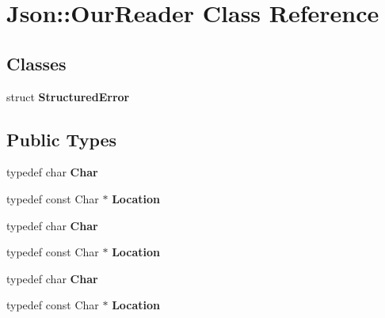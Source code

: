 \section{Json\+:\+:Our\+Reader Class Reference}
\label{class_json_1_1_our_reader}
\subsection*{Classes}
\begin{DoxyCompactItemize}
\item 
struct {\bf Structured\+Error}
\end{DoxyCompactItemize}
\subsection*{Public Types}
\begin{DoxyCompactItemize}
\item 
typedef char {\bfseries Char}\label{class_json_1_1_our_reader_a0cd0bab4caa66594ab843ccd5f9dc239}

\item 
typedef const Char $\ast$ {\bfseries Location}\label{class_json_1_1_our_reader_a1bdc7bbc52ba87cae6b19746f2ee0189}

\item 
typedef char {\bfseries Char}\label{class_json_1_1_our_reader_a0cd0bab4caa66594ab843ccd5f9dc239}

\item 
typedef const Char $\ast$ {\bfseries Location}\label{class_json_1_1_our_reader_a1bdc7bbc52ba87cae6b19746f2ee0189}

\item 
typedef char {\bfseries Char}\label{class_json_1_1_our_reader_a0cd0bab4caa66594ab843ccd5f9dc239}

\item 
typedef const Char $\ast$ {\bfseries Location}\label{class_json_1_1_our_reader_a1bdc7bbc52ba87cae6b19746f2ee0189}

\end{DoxyCompactItemize}
